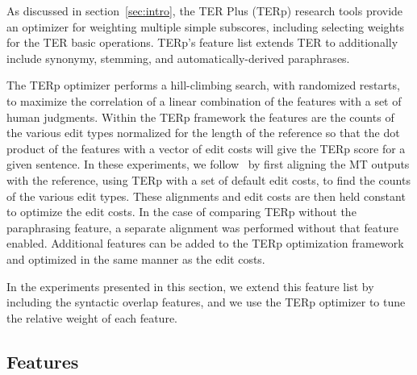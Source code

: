 \documentclass{kluwer}    %
\begin{document}
\begin{article}
As discussed in section~\ref{sec:intro}, the TER Plus (TERp) research
tools \cite{snover09terp} provide an optimizer for weighting multiple
simple subscores, including selecting weights for the TER basic
operations. TERp's feature list extends TER to additionally include
synonymy, stemming, and automatically-derived paraphrases.

The TERp optimizer performs a hill-climbing search, with randomized
restarts, to maximize the correlation of a linear combination of the
features with a set of human judgments.  Within the TERp framework the
features are the counts of the various edit types normalized for the
length of the reference so that the dot product of the features with a
vector of edit costs will give the TERp score for a given sentence.  In
these experiments, we follow~ by first
aligning the MT outputs with the reference, using TERp with a set of
default edit costs, to find the counts of the various edit types.
These alignments and edit costs are then held constant to optimize the
edit costs. In the case of comparing TERp without the paraphrasing
feature, a separate alignment was performed without that feature
enabled.  Additional features can be added to the TERp optimization
framework and optimized in the same manner as the edit costs.

In the experiments presented in this section, we extend this feature
list by including the syntactic overlap features, and we use the TERp
optimizer to tune the relative weight of each feature.

\subsection{Features}


\end{article}
\end{document}
